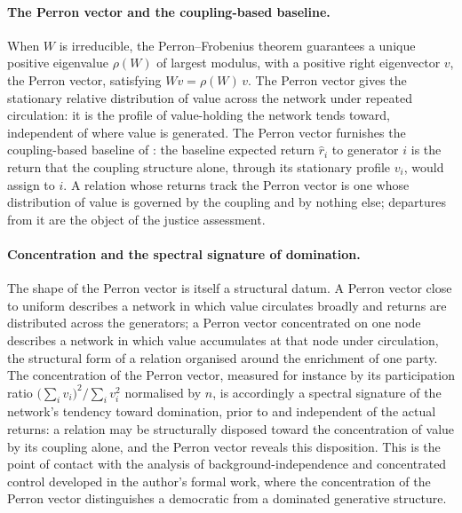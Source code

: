 \paragraph{The Perron vector and the coupling-based baseline.}
When $W$ is irreducible, the Perron--Frobenius theorem guarantees a unique positive eigenvalue $\rho(W)$ of largest modulus, with a positive right eigenvector $v$, the Perron vector, satisfying $Wv = \rho(W)\,v$. The Perron vector gives the stationary relative distribution of value across the network under repeated circulation: it is the profile of value-holding the network tends toward, independent of where value is generated. The Perron vector furnishes the coupling-based baseline of : the baseline expected return $\hat{r}_i$ to generator $i$ is the return that the coupling structure alone, through its stationary profile $v_i$, would assign to $i$. A relation whose returns track the Perron vector is one whose distribution of value is governed by the coupling and by nothing else; departures from it are the object of the justice assessment.

\paragraph{Concentration and the spectral signature of domination.}
The shape of the Perron vector is itself a structural datum. A Perron vector close to uniform describes a network in which value circulates broadly and returns are distributed across the generators; a Perron vector concentrated on one node describes a network in which value accumulates at that node under circulation, the structural form of a relation organised around the enrichment of one party. The concentration of the Perron vector, measured for instance by its participation ratio $\big(\sum_i v_i\big)^2 \big/ \sum_i v_i^2$ normalised by $n$, is accordingly a spectral signature of the network's tendency toward domination, prior to and independent of the actual returns: a relation may be structurally disposed toward the concentration of value by its coupling alone, and the Perron vector reveals this disposition. This is the point of contact with the analysis of background-independence and concentrated control developed in the author's formal work, where the concentration of the Perron vector distinguishes a democratic from a dominated generative structure.


